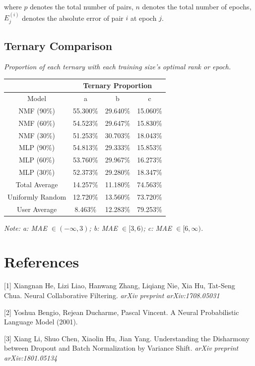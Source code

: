 \documentclass[12pt]{article}
\begin{document}
        where $p$ denotes the total number of pairs, $n$ denotes the total number of epochs, $E_j^{(i)}$ denotes the absolute error of pair $i$ at epoch $j$.


      \newpage\subsection{Ternary Comparison}

        \begin{center}
          \textit{Proportion of each ternary with each training size's optimal rank or epoch.}

          \begin{tabular}{| c || c| c | c|}
            \hline
            &\multicolumn{3}{c|}{Ternary Proportion} \\
            \hline
            Model & a & b & c \\
            \hline
            NMF (90\%) & 55.300\%  & 29.640\% & 15.060\% \\
            NMF (60\%) & 54.523\%  & 29.647\% & 15.830\% \\
            NMF (30\%) & 51.253\%  & 30.703\% & 18.043\% \\
            \hline
            MLP (90\%) & 54.813\%  & 29.333\% & 15.853\% \\
            MLP (60\%) & 53.760\%  & 29.967\% & 16.273\% \\
            MLP (30\%) & 52.373\%  & 29.280\% & 18.347\% \\
            \hline
            Total Average & 14.257\% & 11.180\% & 74.563\% \\
            Uniformly Random & 12.720\% & 13.560\% & 73.720\% \\
            User Average &  8.463\% & 12.283\% & 79.253\% \\
            \hline
          \end{tabular}

          \textit{Note: a: MAE $\in (-\infty ,3)$; b: MAE $\in [3 ,6)$; c: MAE $\in [6 ,\infty)$.}

        \end{center}


\newpage \section*{References}

\small

[1]	Xiangnan He, Lizi Liao, Hanwang Zhang, Liqiang Nie, Xia Hu, Tat-Seng Chua. Neural Collaborative Filtering. \textit{arXiv preprint arXiv:1708.05031}


[2] Yoshua Bengio, Rejean Ducharme, Pascal Vincent. A Neural Probabilistic Language Model (2001).


[3] Xiang Li, Shuo Chen, Xiaolin Hu, Jian Yang. Understanding the Disharmony between Dropout and Batch Normalization by Variance Shift. \textit{arXiv preprint arXiv:1801.05134}
\end{document}
